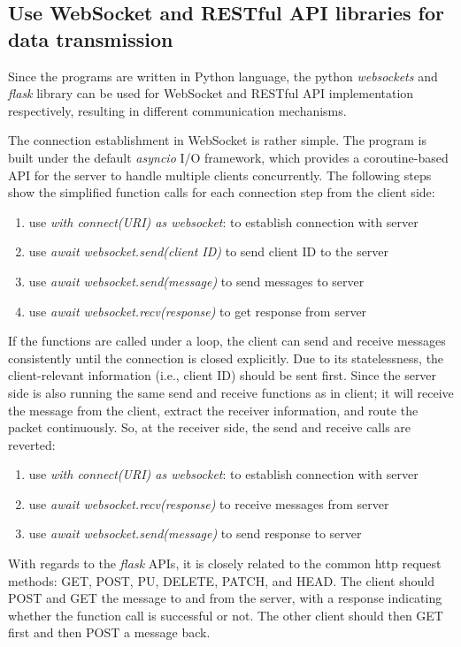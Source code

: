 \subsection{Use WebSocket and RESTful API libraries for data transmission}
Since the programs are written in Python language, the python \textit{websockets} 
and \textit{flask} library can be used for WebSocket and RESTful API implementation 
respectively, resulting in different communication mechanisms. 


The connection establishment in WebSocket is rather simple. The program is 
built under the default \textit{asyncio} I/O framework, which 
provides a coroutine-based API for the server to handle multiple clients 
concurrently. The following steps 
show the simplified function calls for each connection step from the client side: 
\begin{enumerate}
    \item use \textit{with connect(URI) as websocket}: to establish connection with server
    \item use \textit{await websocket.send(client ID)} to send client ID to the server
    \item use \textit{await websocket.send(message)} to send messages to server
    \item use \textit{await websocket.recv(response)} to get response from server
\end{enumerate}
If the functions are called under a loop, the client can send and receive 
messages consistently until the connection is closed explicitly. 
Due to its statelessness, the client-relevant information (i.e., client ID) 
should be sent first. Since the server side is also running the same send 
and receive functions as in client; it will receive the message from the 
client, extract the receiver information, and route the packet continuously. 
So, at the receiver side, the send and receive calls are reverted: 
\begin{enumerate}
    \item use \textit{with connect(URI) as websocket}: to establish connection with server
    \item use \textit{await websocket.recv(response)} to receive messages from server
    \item use \textit{await websocket.send(message)} to send response to server
\end{enumerate}

With regards to the \textit{flask} APIs, it is closely related to the common 
\gls{http} request methods: GET, POST, PU, DELETE, PATCH, and HEAD. 
The client should POST and GET the message to and from the server, with 
a response indicating whether the function call is successful or not. The 
other client should then GET first and then POST a message back.  


